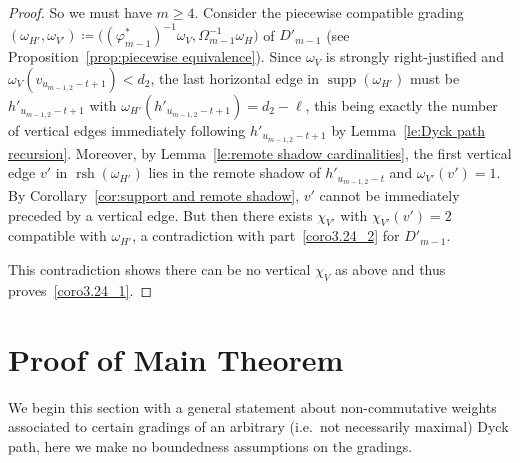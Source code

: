 \documentclass[10pt]{amsart}
\theoremstyle{definition}
\newcommand{\ie}{i.e.\ }
\DeclareMathOperator{\supp}{supp}
\DeclareMathOperator{\rsh}{rsh}
\begin{document}
\begin{proof}
 So we must have $m\ge4$.
 Consider the piecewise compatible grading $(\omega_{H'},\omega_{V'})\coloneqq \big((\varphi^*_{m-1})^{-1}\omega_V,\Omega_{m-1}^{-1}\omega_H\big)$ of $D'_{m-1}$ (see Proposition~\ref{prop:piecewise equivalence}).
 Since $\omega_V$ is strongly right-justified and $\omega_V(v_{u_{m-1,2}-t+1})<d_2$, the last horizontal edge in $\supp(\omega_{H'})$ must be $h'_{u_{m-1,2}-t+1}$ with $\omega_{H'}(h'_{u_{m-1,2}-t+1})=d_2-\ell$, this being exactly the number of vertical edges immediately following $h'_{u_{m-1,2}-t+1}$ by Lemma~\ref{le:Dyck path recursion}.
 Moreover, by Lemma~\ref{le:remote shadow cardinalities}, the first vertical edge $v'$ in $\rsh(\omega_{H'})$ lies in the remote shadow of $h'_{u_{m-1,2}-t}$ and $\omega_{V'}(v')=1$.
 By Corollary~\ref{cor:support and remote shadow}, $v'$ cannot be immediately preceded by a vertical edge.
 But then there exists $\chi_{V'}$ with $\chi_{V'}(v')=2$ compatible with $\omega_{H'}$, a contradiction with part~\ref{coro3.24_2} for $D'_{m-1}$.
 
 This contradiction shows there can be no vertical $\chi_V$ as above and thus proves~\ref{coro3.24_1}.
\end{proof}


\section{Proof of Main Theorem}
\label{sec:proof of main}

\noindent
We begin this section with a general statement about non-commutative weights associated to certain gradings of an arbitrary (\ie not necessarily maximal) Dyck path, here we make no boundedness assumptions on the gradings.
\end{document}
